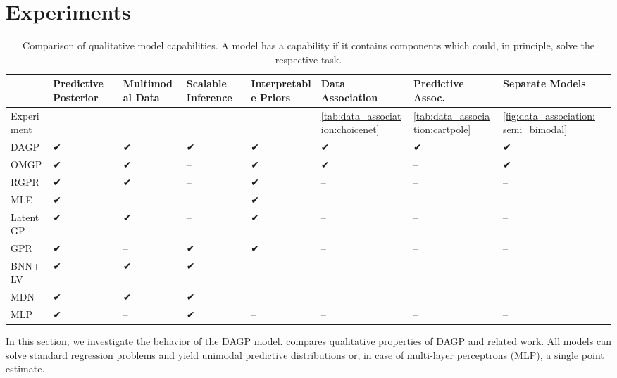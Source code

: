 \section{Experiments}
\label{toc:data_association:experiments}
\begin{table}[t]
    \centering
    \caption[Comparison of DAGP to similar models]{
        \label{tab:data_association:model_capabilities}
        Comparison of qualitative model capabilities.
        A model has a capability if it contains components which could, in principle, solve the respective task.
    }
    \scriptsize
    \newcommand{\yes}{✔}
    \newcommand{\no}{--}
    \newcommand{\resultrow}[9]{#1 & #4 & #7 & #3 & #9 & #5 & #6 & #8 \\}
    \begin{tabularx}{\linewidth}{lYYYYYYYY}
        \toprule
        \resultrow{}{Bayesian}{Scalable Inference}{Predictive Posterior}{Data Association}{Predictive Assoc.}{Multimodal Data}{Separate Models}{Interpretable Priors}
        \midrule
        Experiment &  &  &  &  & \cref{tab:data_association:choicenet} & \cref{tab:data_association:cartpole} & \cref{fig:data_association:semi_bimodal} \\
        \midrule
        \resultrow{DAGP}{\yes}{\yes}{\yes}{\yes}{\yes}{\yes}{\yes}{\yes}
        \addlinespace
        \resultrow{OMGP \parencite{lazaro-gredilla_overlapping_2012}}{\yes}{\no}{\yes}{\yes}{\no}{\yes}{\yes}{\yes}
        \resultrow{RGPR \parencite{rasmussen_infinite_2002}}{\yes}{\no}{\yes}{\no}{\no}{\yes}{\no}{\yes}
        \resultrow{MLE \parencite{tresp_mixtures_2001}}{\yes}{\no}{\yes}{\no}{\no}{\no}{\no}{\yes}
        \resultrow{LatentGP \parencite{bodin_latent_2017}}{\yes}{\no}{\yes}{\no}{\no}{\yes}{\no}{\yes}
        \resultrow{GPR \parencite{rasmussen_gaussian_2006}}{\yes}{\yes}{\yes}{\no}{\no}{\no}{\no}{\yes}
        \addlinespace
        \resultrow{BNN+LV \parencite{depeweg_learning_2016}}{\yes}{\yes}{\yes}{\no}{\no}{\yes}{\no}{\no}
        \resultrow{MDN \parencite{bishop_mixture_1994}}{\no}{\yes}{\yes}{\no}{\no}{\yes}{\no}{\no}
        \resultrow{MLP}{\no}{\yes}{\yes}{\no}{\no}{\no}{\no}{\no}
        \bottomrule
    \end{tabularx}
\end{table}
In this section, we investigate the behavior of the DAGP model.
 compares qualitative properties of DAGP and related work.
All models can solve standard regression problems and yield unimodal predictive distributions or, in case of multi-layer perceptrons (MLP), a single point estimate.
